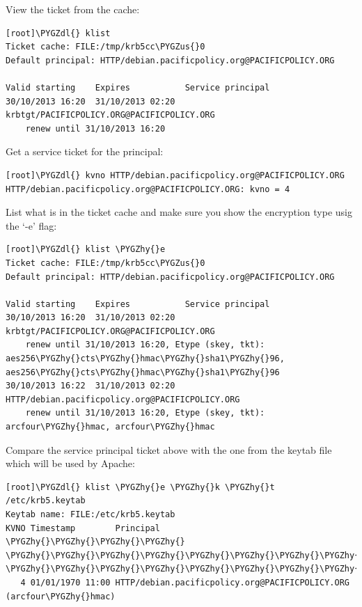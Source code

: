\documentclass[letterpaper,10pt,english]{sphinxmanual}
\def\PYGZus{\char`\_}
\def\PYGZdl{\char`\$}
\def\PYGZhy{\char`\-}
\begin{document}
View the ticket from the cache:

\begin{Verbatim}[commandchars=\\\{\}]
[root]\PYGZdl{} klist
Ticket cache: FILE:/tmp/krb5cc\PYGZus{}0
Default principal: HTTP/debian.pacificpolicy.org@PACIFICPOLICY.ORG

Valid starting    Expires           Service principal
30/10/2013 16:20  31/10/2013 02:20  krbtgt/PACIFICPOLICY.ORG@PACIFICPOLICY.ORG
    renew until 31/10/2013 16:20
\end{Verbatim}

Get a service ticket for the principal:

\begin{Verbatim}[commandchars=\\\{\}]
[root]\PYGZdl{} kvno HTTP/debian.pacificpolicy.org@PACIFICPOLICY.ORG
HTTP/debian.pacificpolicy.org@PACIFICPOLICY.ORG: kvno = 4
\end{Verbatim}

List what is in the ticket cache and make sure you show the encryption
type usig the `-e' flag:

\begin{Verbatim}[commandchars=\\\{\}]
[root]\PYGZdl{} klist \PYGZhy{}e
Ticket cache: FILE:/tmp/krb5cc\PYGZus{}0
Default principal: HTTP/debian.pacificpolicy.org@PACIFICPOLICY.ORG

Valid starting    Expires           Service principal
30/10/2013 16:20  31/10/2013 02:20  krbtgt/PACIFICPOLICY.ORG@PACIFICPOLICY.ORG
    renew until 31/10/2013 16:20, Etype (skey, tkt): aes256\PYGZhy{}cts\PYGZhy{}hmac\PYGZhy{}sha1\PYGZhy{}96, aes256\PYGZhy{}cts\PYGZhy{}hmac\PYGZhy{}sha1\PYGZhy{}96
30/10/2013 16:22  31/10/2013 02:20  HTTP/debian.pacificpolicy.org@PACIFICPOLICY.ORG
    renew until 31/10/2013 16:20, Etype (skey, tkt): arcfour\PYGZhy{}hmac, arcfour\PYGZhy{}hmac
\end{Verbatim}

Compare the service principal ticket above with the one from the
keytab file which will be used by Apache:

\begin{Verbatim}[commandchars=\\\{\}]
[root]\PYGZdl{} klist \PYGZhy{}e \PYGZhy{}k \PYGZhy{}t /etc/krb5.keytab
Keytab name: FILE:/etc/krb5.keytab
KVNO Timestamp        Principal
\PYGZhy{}\PYGZhy{}\PYGZhy{}\PYGZhy{} \PYGZhy{}\PYGZhy{}\PYGZhy{}\PYGZhy{}\PYGZhy{}\PYGZhy{}\PYGZhy{}\PYGZhy{}\PYGZhy{}\PYGZhy{}\PYGZhy{}\PYGZhy{}\PYGZhy{}\PYGZhy{}\PYGZhy{}\PYGZhy{} \PYGZhy{}\PYGZhy{}\PYGZhy{}\PYGZhy{}\PYGZhy{}\PYGZhy{}\PYGZhy{}\PYGZhy{}\PYGZhy{}\PYGZhy{}\PYGZhy{}\PYGZhy{}\PYGZhy{}\PYGZhy{}\PYGZhy{}\PYGZhy{}\PYGZhy{}\PYGZhy{}\PYGZhy{}\PYGZhy{}\PYGZhy{}\PYGZhy{}\PYGZhy{}\PYGZhy{}\PYGZhy{}\PYGZhy{}\PYGZhy{}\PYGZhy{}\PYGZhy{}\PYGZhy{}\PYGZhy{}\PYGZhy{}\PYGZhy{}\PYGZhy{}\PYGZhy{}\PYGZhy{}\PYGZhy{}\PYGZhy{}\PYGZhy{}\PYGZhy{}\PYGZhy{}\PYGZhy{}\PYGZhy{}\PYGZhy{}\PYGZhy{}\PYGZhy{}\PYGZhy{}\PYGZhy{}\PYGZhy{}\PYGZhy{}\PYGZhy{}\PYGZhy{}\PYGZhy{}\PYGZhy{}\PYGZhy{}\PYGZhy{}\PYGZhy{}
   4 01/01/1970 11:00 HTTP/debian.pacificpolicy.org@PACIFICPOLICY.ORG (arcfour\PYGZhy{}hmac)
\end{Verbatim}
\end{document}
